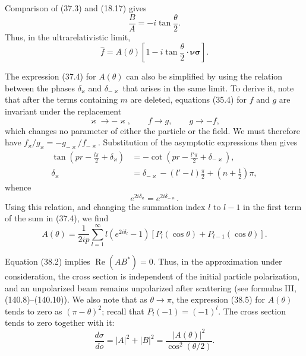 Comparison of (37.3) and (18.17) gives
\begin{equation}
\frac BA=-i\tan\frac\theta2.
\tag{38.2}
\end{equation}
Thus, in the ultrarelativistic limit,
\begin{equation}
\widehat f=A(\theta)\left[1-i\tan\frac\theta2\cdot
\boldsymbol\nu\boldsymbol\sigma\right].
\tag{38.3}
\end{equation}

The expression (37.4) for $A(\theta)$ can also be simplified by using the relation between the phases $\delta_\varkappa$ and $\delta_{-\varkappa}$ that arises in the same limit. To derive it, note that after the terms containing $m$ are deleted, equations (35.4) for $f$ and $g$ are invariant under the replacement
\[
\varkappa\to-\varkappa,
\qquad f\to g,
\qquad g\to-f,
\]
which changes no parameter of either the particle or the field. We must therefore have $f_\varkappa/g_\varkappa=-g_{-\varkappa}/f_{-\varkappa}$. Substitution of the asymptotic expressions then gives
\[
\begin{aligned}
\tan\left(pr-\frac{l\pi}{2}+\delta_\varkappa\right)
&=-\cot\left(pr-\frac{l'\pi}{2}+\delta_{-\varkappa}\right),\\
\delta_\varkappa&=\delta_{-\varkappa}-(l'-l)\frac\pi2
+\left(n+\frac12\right)\pi,
\end{aligned}
\]
whence
\begin{equation}
e^{2i\delta_\varkappa}=e^{2i\delta_{-\varkappa}}.
\tag{38.4}
\end{equation}
Using this relation, and changing the summation index $l$ to $l-1$ in the first term of the sum in (37.4), we find
\begin{equation}
A(\theta)=\frac1{2ip}\sum_{l=1}^{\infty}
l(e^{2i\delta_l}-1)[P_l(\cos\theta)+P_{l-1}(\cos\theta)].
\tag{38.5}
\end{equation}

Equation (38.2) implies $\operatorname{Re}(AB^*)=0$. Thus, in the approximation under consideration, the cross section is independent of the initial particle polarization, and an unpolarized beam remains unpolarized after scattering (see formulas III, (140.8)--(140.10)). We also note that as $\theta\to\pi$, the expression (38.5) for $A(\theta)$ tends to zero as $(\pi-\theta)^2$; recall that $P_l(-1)=(-1)^l$. The cross section tends to zero together with it:
\begin{equation}
\frac{d\sigma}{do}=|A|^2+|B|^2
=\frac{|A(\theta)|^2}{\cos^2(\theta/2)}.
\tag{38.6}
\end{equation}

